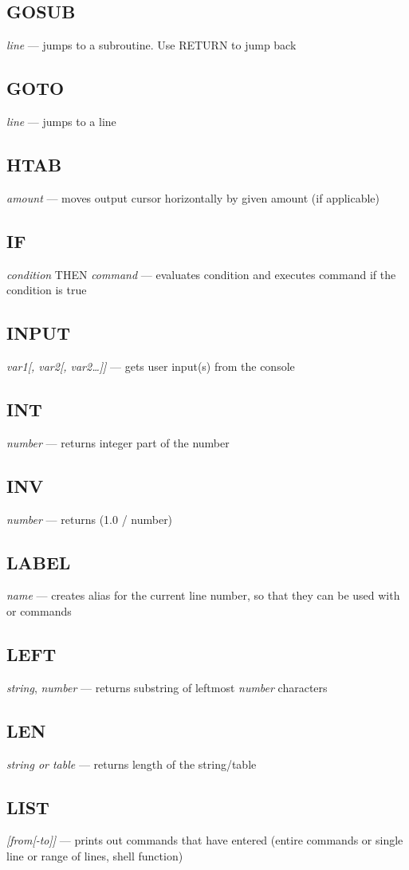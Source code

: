 \subsection{GOSUB} \emph{line} --- jumps to a subroutine. Use RETURN to jump back
\subsection{GOTO} \emph{line} --- jumps to a line
\subsection{HTAB} \emph{amount} --- moves output cursor horizontally by given amount (if applicable)
\subsection{IF} \emph{condition} THEN \emph{command} --- evaluates condition and executes command if the condition is true
\subsection{INPUT} \emph{var1[, var2[, var2\ldots]]} --- gets user input(s) from the console
\subsection{INT} \emph{number} --- returns integer part of the number
\subsection{INV} \emph{number} --- returns (1.0 / number)
\subsection{LABEL} \emph{name} --- creates alias for the current line number, so that they can be used with  or  commands
\subsection{LEFT} \emph{string}, \emph{number} --- returns substring of leftmost \emph{number} characters
\subsection{LEN} \emph{string or table} --- returns length of the string/table
\subsection{LIST} \emph{[from[-to]]} --- prints out commands that have entered (entire commands or single line or range of lines, shell function)

